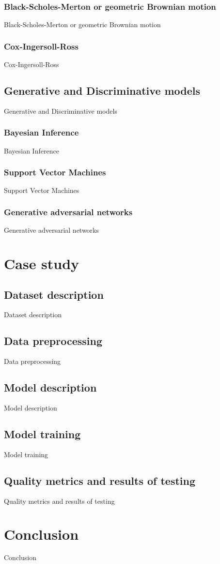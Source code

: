 \documentclass{article}
\theoremstyle{definition}
\begin{document}
\subsubsection{Black-Scholes-Merton or geometric Brownian motion}
Black-Scholes-Merton or geometric Brownian motion

\subsubsection{Cox-Ingersoll-Ross}
Cox-Ingersoll-Ross

\subsection{Generative and Discriminative models}
Generative and Discriminative models

\subsubsection{Bayesian Inference}
Bayesian Inference

\subsubsection{Support Vector Machines}
Support Vector Machines

\subsubsection{Generative adversarial networks}
Generative adversarial networks

\section{Case study}

\subsection{Dataset description}
Dataset description

\subsection{Data preprocessing}
Data preprocessing

\subsection{Model description}
Model description

\subsection{Model training}
Model training

\subsection{Quality metrics and results of testing}
Quality metrics and results of testing

\section{Conclusion}
Conclusion


\end{document}

